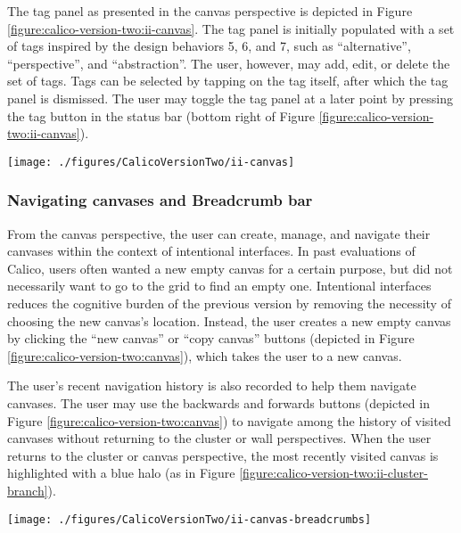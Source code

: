 The tag panel as presented in the canvas perspective is depicted in Figure \ref{figure:calico-version-two:ii-canvas}. The tag panel is initially populated with a set of tags inspired by the design behaviors 5, 6, and 7, such as ``alternative'', ``perspective'', and ``abstraction''. The user, however, may add, edit, or delete the set of tags. Tags can be selected by tapping on the tag itself, after which the tag panel is dismissed. The user may toggle the tag panel at a later point by pressing the tag button in the status bar (bottom right of Figure \ref{figure:calico-version-two:ii-canvas}).

\begin{figure*}[tbh]
  \centering
  \texttt{[image: ./figures/CalicoVersionTwo/ii-canvas]}
  \caption{The tag panel appears in the upper-right upon entering a newly created canvas.}
  \label{figure:calico-version-two:ii-canvas}
\end{figure*}

\subsubsection{Navigating canvases and Breadcrumb bar} 

From the canvas perspective, the user can create, manage, and navigate their canvases within the context of intentional interfaces. In past evaluations of Calico, users often wanted a new empty canvas for a certain purpose, but did not necessarily want to go to the grid to find an empty one. Intentional interfaces reduces the cognitive burden of the previous version by removing the necessity of choosing the new canvas's location. Instead, the user creates a new empty canvas by clicking the ``new canvas'' or ``copy canvas'' buttons (depicted in Figure \ref{figure:calico-version-two:canvas}), which takes the user to a new canvas.

The user's recent navigation history is also recorded to help them navigate canvases. The user may use the backwards and forwards buttons (depicted in Figure \ref{figure:calico-version-two:canvas}) to navigate among the history of visited canvases without returning to the cluster or wall perspectives. When the user returns to the cluster or canvas perspective, the most recently visited canvas is highlighted with a blue halo (as in Figure \ref{figure:calico-version-two:ii-cluster-branch}).

\begin{figure*}[tbh]
  \centering
  \texttt{[image: ./figures/CalicoVersionTwo/ii-canvas-breadcrumbs]}
  \caption{The breadcrumb bar in the upper-left enables users to navigate between canvases without using the wall or cluster perspectives.}
  \label{figure:calico-version-two:ii-canvas-breadcrumbs}
\end{figure*}

